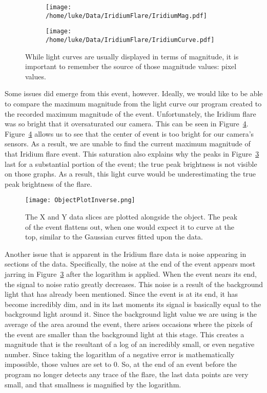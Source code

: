 \begin{figure}
\centering
\begin{subfigure}{.5\textwidth}
	\centering
	\texttt{[image: /home/luke/Data/IridiumFlare/IridiumMag.pdf]}
	\label{fig:Iridiummag}
\end{subfigure}%
\begin{subfigure}{.5\textwidth}
	\centering
	\texttt{[image: /home/luke/Data/IridiumFlare/IridiumCurve.pdf]}
	\label{fig:Iridiumcurve}
	\end{subfigure}
\caption{While light curves are usually displayed in terms of magnitude, it is important to remember the source of those magnitude values: pixel values.}
\label{fig:IridiumCurves}
\end{figure}

Some issues did emerge from this event, however. Ideally, we would like to be able to compare the maximum magnitude from the light curve our program created to the recorded maximum magnitude of the event. Unfortunately, the Iridium flare was so bright that it oversaturated our camera. This can be seen in Figure~\ref{fig:ObjectPlot055}. Figure~\ref{fig:ObjectPlot055} allows us to see that the center of event is too bright for our camera's sensors. As a result, we are unable to find the current maximum magnitude of that Iridium flare event. This saturation also explains why the peaks in Figure~\ref{fig:IridiumCurves} last for a substantial portion of the event; the true peak brightness is not visible on those graphs. As a result, this light curve would be underestimating the true peak brightness of the flare.

\begin{figure}[ht!]
	\centering
	\texttt{[image: ObjectPlotInverse.png]}
	\caption{The X and Y data slices are plotted alongside the object. The peak of the event flattens out, when one would expect it to curve at the top, similar to the Gaussian curves fitted upon the data.}
	\label{fig:ObjectPlot055}
\end{figure}

Another issue that is apparent in the Iridium flare data is noise appearing in sections of the data. Specifically, the noise at the end of the event appears most jarring in Figure~\ref{fig:IridiumCurves} after the logarithm is applied. When the event nears its end, the signal to noise ratio greatly decreases. This noise is a result of the background light that has already been mentioned. Since the event is at its end, it has become incredibly dim, and in its last moments its signal is basically equal to the background light around it. Since the background light value we are using is the average of the area around the event, there arises occasions where the pixels of the event are smaller than the background light at this stage. This creates a magnitude that is the resultant of a log of an incredibly small, or even negative number. Since taking the logarithm of a negative error is mathematically impossible, those values are set to 0. So, at the end of an event before the program no longer detects any trace of the flare, the last data points are very small, and that smallness is magnified by the logarithm.

